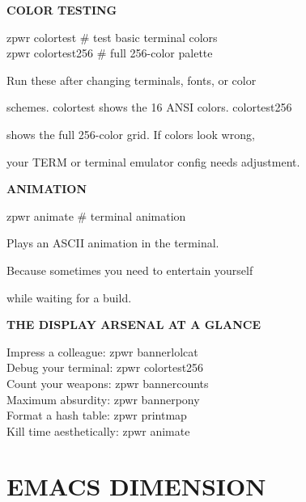 \documentclass[11pt,a4paper,twoside]{book}
\begin{document}
\vspace{12pt}
{\bfseries\color{neonyellow} COLOR TESTING}\vspace{4pt}

\begin{codebox}
zpwr colortest                      \# test basic terminal colors\\
zpwr colortest256                   \# full 256-color palette\\
\end{codebox}

Run these after changing terminals, fonts, or color

schemes. colortest shows the 16 ANSI colors. colortest256

shows the full 256-color grid. If colors look wrong,

your TERM or terminal emulator config needs adjustment.


\vspace{12pt}
{\bfseries\color{neonyellow} ANIMATION}\vspace{4pt}

\begin{codebox}
zpwr animate                        \# terminal animation\\
\end{codebox}

Plays an ASCII animation in the terminal.

Because sometimes you need to entertain yourself

while waiting for a build.


\vspace{12pt}
{\bfseries\color{neonyellow} THE DISPLAY ARSENAL AT A GLANCE}\vspace{4pt}

\begin{codebox}
Impress a colleague:      zpwr bannerlolcat\\
Debug your terminal:       zpwr colortest256\\
Count your weapons:        zpwr bannercounts\\
Maximum absurdity:         zpwr bannerpony\\
Format a hash table:       zpwr printmap\\
Kill time aesthetically:   zpwr animate\\
\end{codebox}


\vspace{16pt}


\chapter{EMACS DIMENSION}
\end{document}
